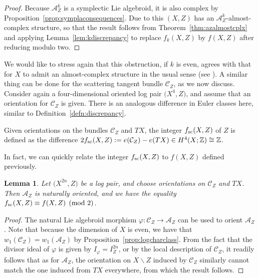 \documentclass[10pt,a4paper]{amsart}
\numberwithin{equation}{section}
\newtheorem{Lemma}[Theorem]{Lemma}
\begin{document}
\begin{proof} Because $\mathcal{A}_Z^k$ is a symplectic Lie algebroid, it is also complex by Proposition~\ref{prop:symplaconsequences}. Due to this $(X,Z)$ has an $\mathcal{A}_Z^k$-almost-complex structure, so that the result follows from Theorem~\ref{thm:azalmostcplx} and applying Lemma~\ref{lem:kdiscrepancy} to replace $f_k(X,Z)$ by $f(X,Z)$ after reducing modulo two.
\end{proof}


We would like to stress again that this obstruction, if $k$ is even, agrees with that for $X$ to admit an almost-complex structure in the usual sense (see \cite[Theorem~1.4.13]{GompfStipsicz99}).
A similar thing can be done for the scattering tangent bundle $\mathcal{C}_Z$, as we now discuss. Consider again a four-dimensional oriented log pair $\big(X^4, Z\big)$, and assume that an orientation for $\mathcal{C}_Z$ is given. There is an analogous difference in Euler classes here, similar to Definition~\ref{defn:discrepancy}.

\begin{Definition} Given orientations on the bundles $\mathcal{C}_Z$ and $TX$, the integer $f_{\rm sc}(X,Z)$ of $Z$ is defined as the difference $2 f_{\rm sc}(X,Z) := e(\mathcal{C}_Z) - e(TX) \in H^4(X;\mathbb{Z}) \cong \mathbb{Z}$.
\end{Definition}

In fact, we can quickly relate the integer $f_{\rm sc}(X,Z)$ to $f(X,Z)$ defined previously.

\begin{Lemma}\label{lem:scdiscrepancy} Let $\big(X^{2n}, Z\big)$ be a log pair, and choose orientations on $\mathcal{C}_Z$ and $TX$. Then $\mathcal{A}_Z$ is naturally oriented, and we have the equality $f_{\rm sc}(X,Z) \equiv f(X,Z) \pmod{2}$.
\end{Lemma}

\begin{proof} The natural Lie algebroid morphism $\varphi\colon \mathcal{C}_Z \to \mathcal{A}_Z$ can be used to orient $\mathcal{A}_Z$. Note that because the dimension of $X$ is even, we have that $w_1(\mathcal{C}_Z) = w_1(\mathcal{A}_Z)$ by Proposition~\ref{prop:logcharclass}. From the fact that the divisor ideal of $\varphi$ is given by $I_\varphi = I_Z^{2n}$, or by the local description of $\mathcal{C}_Z$, it readily follows that as for $\mathcal{A}_Z$, the orientation on $X\backslash Z$ induced by $\mathcal{C}_Z$ similarly cannot match the one induced from $TX$ everywhere, from which the result follows.
\end{proof}
\end{document}
